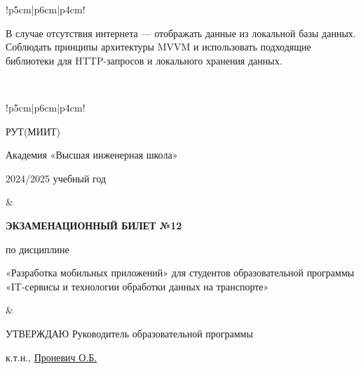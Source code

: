 \documentclass[a4paper]{article}
\begin{document}
\begin{tabular}{!{\vrule width 2pt}p{5cm}|p{6cm}|p{4cm}!{\vrule width 2pt}}
{\begin{minipage}{16cm}
\begin{enumerate}
В случае отсутствия интернета — отображать данные из локальной базы данных.
Соблюдать принципы архитектуры MVVM и использовать подходящие библиотеки для HTTP-запросов и локального хранения данных. 
\end{enumerate}

\vspace{0.2cm}
    
\end{minipage}
}
\\
\end{tabular}

\newpage


\begin{tabular}{!{\vrule width 2pt}p{5cm}|p{6cm}|p{4cm}!{\vrule width 2pt}}

    {\centering 
    \fontsize{14pt}{16pt}\selectfont
    РУТ(МИИТ)

\vspace{14pt}

Академия «Высшая инженерная школа»

\vspace{14pt}

2024/2025 учебный год

    }
&
{
    \centering
\fontsize{14pt}{16pt}\selectfont

\textbf{ЭКЗАМЕНАЦИОННЫЙ
БИЛЕТ №12}


по дисциплине 

«Разработка мобильных приложений» 
\fontsize{12pt}{14pt}\selectfont
для студентов образовательной программы «IT-сервисы и технологии обработки данных на транспорте»

}
&
{
\centering
\fontsize{14pt}{16pt}\selectfont

УТВЕРЖДАЮ
Руководитель образовательной программы

\vspace{1cm}

\fontsize{12pt}{14pt}\selectfont
\underline{\hspace{3cm}}

к.т.н., \underline{Проневич О.Б.}

}
\\
\hline
{}
\end{tabular}
\end{document}
